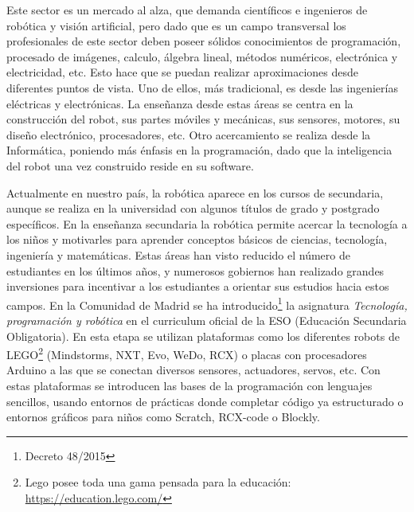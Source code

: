 Este sector es un mercado al alza, que demanda científicos e ingenieros de robótica y visión artificial, pero dado que es un campo transversal los profesionales de este sector deben poseer sólidos conocimientos de programación, procesado de imágenes, calculo, álgebra lineal, métodos numéricos, electrónica y electricidad, etc. Esto hace que se puedan realizar aproximaciones desde diferentes puntos de vista. Uno de ellos, más tradicional, es desde las ingenierías eléctricas y electrónicas. La enseñanza desde estas áreas se centra en la construcción del robot, sus partes móviles y mecánicas, sus sensores, motores, su diseño electrónico, procesadores, etc. Otro acercamiento se realiza desde la Informática, poniendo más énfasis en la programación, dado que la inteligencia del robot una vez construido reside en su software.

Actualmente en nuestro país, la robótica aparece en los cursos de secundaria, aunque se realiza en la universidad con algunos títulos de grado y postgrado específicos. En la enseñanza secundaria la robótica permite acercar la tecnología a los niños y motivarles para aprender conceptos básicos de ciencias, tecnología, ingeniería y matemáticas. Estas áreas han visto reducido el número de estudiantes en los últimos años, y numerosos gobiernos han realizado grandes inversiones para incentivar a los estudiantes a orientar sus estudios hacia estos campos. En la Comunidad de Madrid se ha introducido\footnote{Decreto 48/2015} la asignatura \textit{Tecnología, programación y robótica} en el curriculum oficial de la ESO (Educación Secundaria Obligatoria). En esta etapa se utilizan plataformas como los diferentes robots de LEGO\footnote{Lego posee toda una gama pensada para la educación: \url{https://education.lego.com/}} (Mindstorms, NXT, Evo, WeDo, RCX) o placas con procesadores Arduino a las que se conectan diversos sensores, actuadores, servos, etc. Con estas plataformas se introducen las bases de la programación con lenguajes sencillos, usando entornos de prácticas donde completar código ya estructurado o entornos gráficos para niños como Scratch, RCX-code o Blockly.

